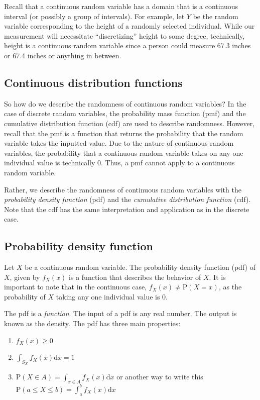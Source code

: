 \documentclass[
  letterpaper,
  DIV=11,
  numbers=noendperiod]{scrreprt}
\begin{document}
Recall that a continuous random variable has a domain that is a
continuous interval (or possibly a group of intervals). For example, let
\(Y\) be the random variable corresponding to the height of a randomly
selected individual. While our measurement will necessitate
``discretizing'' height to some degree, technically, height is a
continuous random variable since a person could measure 67.3 inches or
67.4 inches or anything in between.

\subsection{Continuous distribution
functions}\label{continuous-distribution-functions}

So how do we describe the randomness of continuous random variables? In
the case of discrete random variables, the probability mass function
(pmf) and the cumulative distribution function (cdf) are used to
describe randomness. However, recall that the pmf is a function that
returns the probability that the random variable takes the inputted
value. Due to the nature of continuous random variables, the probability
that a continuous random variable takes on any one individual value is
technically 0. Thus, a pmf cannot apply to a continuous random variable.

Rather, we describe the randomness of continuous random variables with
the \emph{probability density function} (pdf) and the \emph{cumulative
distribution function} (cdf). Note that the cdf has the same
interpretation and application as in the discrete case.

\subsection{Probability density
function}\label{probability-density-function}

Let \(X\) be a continuous random variable. The probability density
function (pdf) of \(X\), given by \(f_X(x)\) is a function that
describes the behavior of \(X\). It is important to note that in the
continuous case, \(f_X(x)\neq \mbox{P}(X=x)\), as the probability of
\(X\) taking any one individual value is 0.

The pdf is a \emph{function}. The input of a pdf is any real number. The
output is known as the density. The pdf has three main properties:

\begin{enumerate}
\def\labelenumi{\arabic{enumi})}
\item
  \(f_X(x)\geq 0\)
\item
  \(\int_{S_X} f_X(x)\mbox{d}x = 1\)
\item
  \(\mbox{P}(X\in A)=\int_{x\in A} f_X(x)\mbox{d}x\) or another way to
  write this \(\mbox{P}(a \leq X \leq b)=\int_{a}^{b} f_X(x)\mbox{d}x\)
\end{enumerate}
\end{document}
